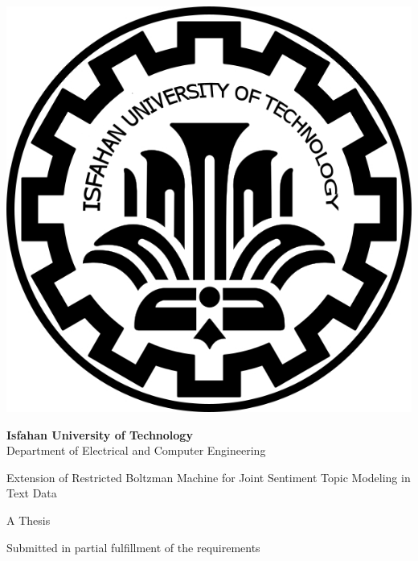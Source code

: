 \thispagestyle{empty}
\begin{latin}
\begin{center}
\includegraphics[scale=0.06]{firstpage-img/iut_logo_en.png}
\vspace{0.4cm}

{\large\textbf{Isfahan University of Technology}}\\

\vspace{0.4cm}
Department of Electrical and Computer Engineering

\vspace{2.5cm}

{\Huge Extension of Restricted Boltzman Machine for Joint Sentiment Topic Modeling in Text Data }

\vspace{1.5cm}

{\large
	A Thesis
	
	\vspace{.3cm}
	
	Submitted in partial fulfillment of the requirements
	
	\vspace{.3cm}
	
}
\end{center}
\end{latin}
